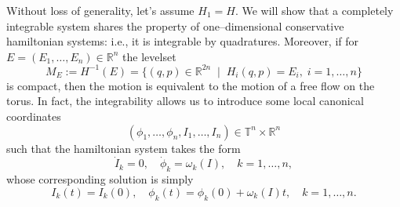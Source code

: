 \documentclass[english,fontsize=11pt,paper=b5]{scrbook}
\theoremstyle{definition}
\begin{document}
      Without loss of generality, let's assume $H_1 = H$.
      We will show that a completely integrable system shares the property of one--dimensional conservative hamiltonian systems: i.e., it is integrable by quadratures.
      Moreover, if for $E = (E_1, \ldots, E_n)\in\mathbb{R}^n$ the levelset
      \begin{equation}\label{eq:levelsetE}
        M_E := H^{-1}(E) = \big\{(q,p)\in\mathbb{R}^{2n} \;\mid\; H_i(q,p)=E_i,\;i=1,\ldots,n \big\}
      \end{equation}
      is compact, then the motion is equivalent to the motion of a free flow on the torus.
      In fact, the integrability allows us to introduce some local canonical coordinates
      \begin{equation}\label{eq:actionalngle}
        (\phi_1, \ldots, \phi_n, I_1, \ldots, I_n) \in \mathbb{T}^n\times\mathbb{R}^n
      \end{equation}
      such that the hamiltonian system takes the form
      \begin{equation}
        \dot I_k = 0, \quad \dot \phi_k = \omega_k(I), \quad k=1,\ldots,n,
      \end{equation}
      whose corresponding solution is simply
      \begin{equation}
        I_k(t)= I_k(0), \quad
        \phi_k(t) = \phi_k(0) + \omega_k(I)t, \quad k = 1,\ldots, n.
      \end{equation}
\end{document}
